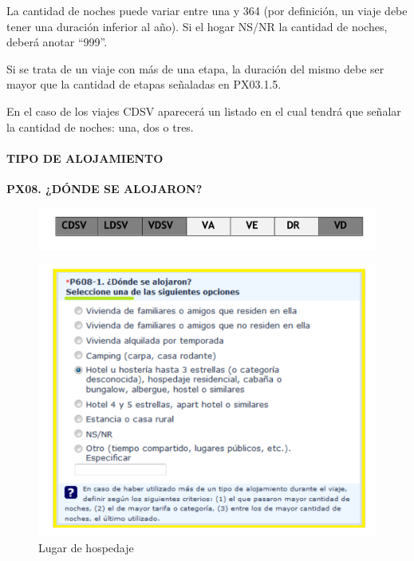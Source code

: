\documentclass[
  openany]{book}
\begin{document}
La cantidad de noches puede variar entre una y 364 (por definición, un viaje debe tener una duración inferior al año). Si el hogar NS/NR la cantidad de noches, deberá anotar ``999''.

Si se trata de un viaje con más de una etapa, la duración del mismo debe ser mayor que la cantidad de etapas señaladas en PX03.1.5.

En el caso de los viajes CDSV aparecerá un listado en el cual tendrá que señalar la cantidad de noches: una, dos o tres.

\hypertarget{tipo-de-alojamiento}{%
\paragraph{\texorpdfstring{\textbf{TIPO DE ALOJAMIENTO}}{TIPO DE ALOJAMIENTO}}\label{tipo-de-alojamiento}}

\textbf{PX08. ¿DÓNDE SE ALOJARON?}

\begin{figure}

{\centering \includegraphics[width=1\linewidth]{imagenes/figura6-96} 

}

\end{figure}

\begin{figure}

{\centering \includegraphics[width=1\linewidth]{imagenes/figura6-97} 

}

\caption{Lugar de hospedaje}\label{fig:lugar3}
\end{figure}
\end{document}
